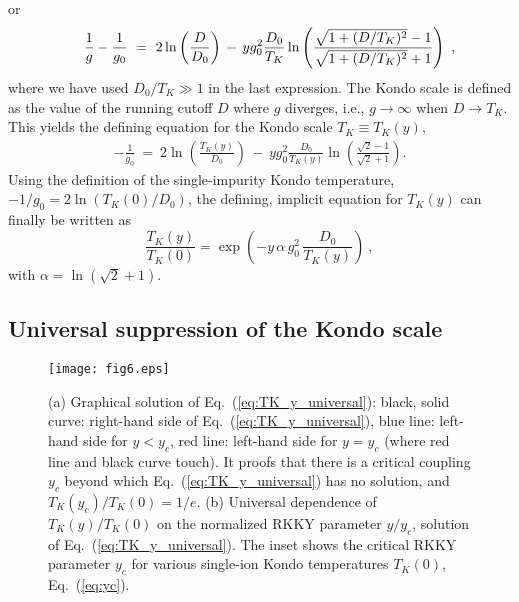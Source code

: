\documentclass[12pt,twoside]{article}
\newcommand{\Eq}[1]{Eq.~(\ref{#1})}
\begin{document}
or 
\begin{eqnarray}
\hspace*{0.5cm} \frac{1}{g}-\frac{1}{g_0} \ =\  \label{eq:RGint2}
2 \ln\left(\frac{D}{D_0}\right) 
\, -\,  yg_0^2\frac{D_0}{T_K} 
\ln\left(
\frac{\sqrt{1+(D/T_K)^2}-1}{\sqrt{1+(D/T_K)^2}+1}
\right) \ ,
\end{eqnarray} 
where we have used $D_0/T_K\gg 1$ in the last expression.
The Kondo scale is defined as the value of the running cutoff $D$
where $g$ diverges, i.e., $g\to\infty$  when $D\to T_K$. This 
yields the defining equation for the Kondo scale $T_K\equiv T_K(y)$,
\begin{eqnarray}
-\frac{1}{g_0} \ = \ \label{eq:TKydef1}
2 \ln\left(\frac{T_K(y)}{D_0}\right) 
\,-\,yg_0^2\frac{D_0}{T_K(y)} 
\ln\left(
\frac{\sqrt{2}-1}{\sqrt{2}+1}
\right) .
\nonumber
\end{eqnarray} 
Using the definition of the single-impurity Kondo temperature,
$-1/g_0=2\ln\left(T_K(0)/D_0\right)$, the defining, implicit equation 
for $T_K(y)$ can finally be written as 
\begin{equation}
\frac{T_K(y)}{T_K(0)} = 
\exp \left( -y\, \alpha\, g_0^2\, \frac{D_0}{T_K(y)} \right) \ ,
\label{eq:TK_y}
\end{equation}
with \hbox{$\alpha =  \ln (\sqrt{2}+1)$}.


\subsection{Universal suppression of the Kondo scale} 
\label{subsec:universality}


\begin{figure}[t] 
\centering
\texttt{[image: fig6.eps]}
\caption{\label{fig:TK_y_universal}
(a) Graphical solution of \Eq{eq:TK_y_universal}: 
black, solid curve: right-hand side of \Eq{eq:TK_y_universal}, blue line: 
left-hand side for $y<y_c$, red line: left-hand side for $y=y_c$ (where 
red line and black curve touch). It proofs that there is a
critical coupling $y_c$ beyond which \Eq{eq:TK_y_universal} has no solution,
and $T_K(y_c)/T_K(0)=1/e$.
(b) Universal dependence of $T_K(y)/T_K(0)$ on the normalized 
RKKY parameter $y/y_c$, solution of \Eq{eq:TK_y_universal}. 
The inset shows the critical RKKY parameter $y_c$ for various single-ion
Kondo temperatures $T_K(0)$, \Eq{eq:yc}.
}   
\end{figure}
\end{document}

